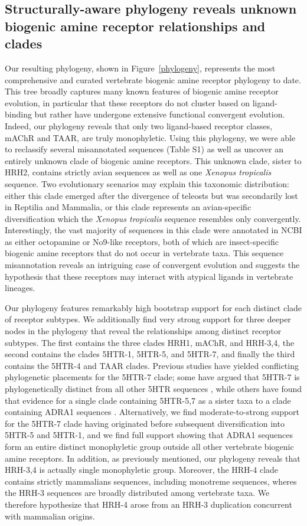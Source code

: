 \documentclass[fleqn,10pt]{wlpeerj}
\begin{document}
\subsection*{Structurally-aware phylogeny reveals unknown biogenic amine receptor relationships and clades}

Our resulting phylogeny, shown in Figure~\ref{phylogeny}, represents the most comprehensive and curated vertebrate biogenic amine receptor phylogeny to date. This tree broadly captures many known features of biogenic amine receptor evolution, in particular that these receptors do not cluster based on ligand-binding but rather have undergone extensive functional convergent evolution. Indeed, our phylogeny reveals that only two ligand-based receptor classes, mAChR and TAAR, are truly monophyletic. Using this phylogeny, we were able to reclassify several misannotated sequences (Table S1) as well as uncover an entirely unknown clade of biogenic amine receptors. This unknown clade, sister to HRH2, contains strictly avian sequences as well as one \emph{Xenopus tropicalis} sequence. Two evolutionary scenarios may explain this taxonomic distribution: either this clade emerged after the divergence of teleosts but was secondarily lost in Reptilia and Mammalia, or this clade represents an avian-specific diversification which the \emph{Xenopus tropicalis} sequence resembles only convergently. Interestingly, the vast majority of sequences in this clade were annotated in NCBI as either octopamine or No9-like receptors, both of which are insect-specific biogenic amine receptors that do not occur in vertebrate taxa. This sequence misannotation reveals an intriguing case of convergent evolution and suggests the hypothesis that these receptors may interact with atypical ligands in vertebrate lineages.

Our phylogeny features remarkably high bootstrap support for each distinct clade of receptor subtypes. We additionally find very strong support for three deeper nodes in the phylogeny that reveal the relationships among distinct receptor subtypes. The first contains the three clades HRH1, mAChR, and HRH-3,4, the second contains the clades 5HTR-1, 5HTR-5, and 5HTR-7, and finally the third contains the 5HTR-4 and TAAR clades. Previous studies have yielded conflicting phylogenetic placements for the 5HTR-7 clade; some have argued that 5HTR-7 is phylogenetically distinct from all other 5HTR sequences \citep{KakaralaJamil2014}, while others have found that evidence for a single clade containing 5HTR-5,7 as a sister taxa to a clade containing ADRA1 sequences \citep{Fredrikssonetal2003}. Alternatively, we find moderate-to-strong support for the 5HTR-7 clade having originated before subsequent diversification into 5HTR-5 and 5HTR-1, and we find full support showing that ADRA1 sequences form an entire distinct monophyletic group outside all other vertebrate biogenic amine receptors. In addition, as previously mentioned, our phylogeny reveals that HRH-3,4 is actually single monophyletic group. Moreover, the HRH-4 clade contains strictly mammalians sequences, including monotreme sequences, wheres the HRH-3 sequences are broadly distributed among vertebrate taxa. We therefore hypothesize that HRH-4 arose from an HRH-3 duplication concurrent with mammalian origins.
\end{document}
